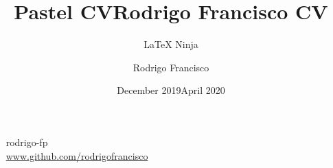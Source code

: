\documentclass[blue]{pastelcv}
\title{Pastel CV}
\author{\LaTeX{} Ninja}
\date{December 2019}
\begin{document}

\title{Rodrigo Francisco CV}
\author{Rodrigo Francisco}
\date{April 2020}

\graphicspath{{assets/}}

\thispagestyle{empty}

\begin{center}
  \jobdescription{\jobdescriptionText}
 
  \getgreyishblackfont
  {
    \small 
  \faLinkedin~ rodrigo-fp\\[2mm]
  \faGithub~ \protect\url{www.github.com/rodrigofrancisco}
  }

\end{center}

\vspace{-2mm}
\begin{center}
  \small \summaryText 
\end{center}
\vspace{2mm}
\end{document}
